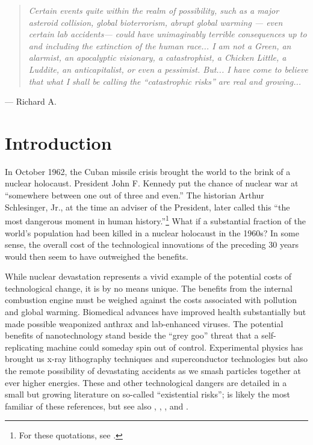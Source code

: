 \documentclass[12pt,twoside]{article}
\newcommand{\cn}[1]{\citet*{#1}}
\begin{document}
\begin{quote}
{\it  
Certain events quite within the realm of possibility, such as a major
asteroid collision, global bioterrorism, abrupt global warming --- even
certain lab accidents--- could have unimaginably terrible consequences
up to and including the extinction of the human race...  I am not a
Green, an alarmist, an apocalyptic visionary, a catastrophist, a Chicken
Little, a Luddite, an anticapitalist, or even a pessimist.  But... I
have come to believe that what I shall be calling the ``catastrophic
risks'' are real and growing...}
\end{quote} \hspace{2.8in} --- Richard A. \citet[p. v]{Posner2004}

\section{Introduction}


In October 1962, the Cuban missile crisis brought the world to the brink
of a nuclear holocaust. President John F. Kennedy put the chance of
nuclear war at ``somewhere between one out of three and even.'' The
historian Arthur Schlesinger, Jr., at the time an adviser of the
President, later called this ``the most dangerous moment in human
history.''\footnote{For these quotations, see \cite[p. 26]{Rees2003}.}
What if a substantial fraction of the world's population had been killed
in a nuclear holocaust in the 1960s? In some sense, the overall cost of
the technological innovations of the preceding 30 years would then seem
to have outweighed the benefits.

While nuclear devastation represents a vivid example of the potential
costs of technological change, it is by no means unique. The benefits
from the internal combustion engine must be weighed against the costs
associated with pollution and global warming. Biomedical advances have
improved health substantially but made possible weaponized anthrax and
lab-enhanced viruses. The potential benefits of nanotechnology stand
beside the ``grey goo'' threat that a self-replicating machine could
someday spin out of control. Experimental physics has brought us x-ray
lithography techniques and superconductor technologies but also the
remote possibility of devastating accidents as we smash particles
together at ever higher energies. These and other technological dangers
are detailed in a small but growing literature on so-called
``existential risks''; \cn{Posner2004} is likely the most familiar of
these references, but see also \cn{Bostrom2002}, \cn{Joy2002},
\cn{Overbye2008}, and \cn{Rees2003}.
\end{document}
